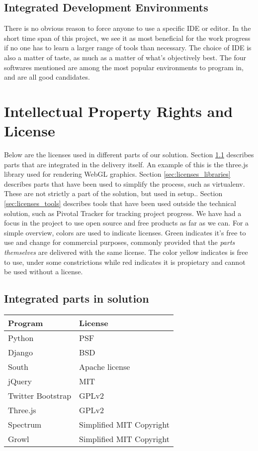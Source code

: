 \documentclass{report}
\begin{document}
\subsection{Integrated Development Environments}
There is no obvious reason to force anyone to use a specific IDE or editor. In the short time span of this project, we see it as most beneficial for the work progress if no one has to learn a larger range of tools than necessary. The choice of IDE is also a matter of taste, as much as a matter of what’s objectively best. The four softwares mentioned are among the most popular environments to program in, and are all good candidates.

\newpage
\section{Intellectual Property Rights and License}
Below are the licenses used in different parts of our solution. Section \ref{sec:licenses_integrated} describes parts that are integrated in the delivery itself. An example of this is the three.js library used for rendering WebGL graphics. Section \ref{sec:licenses_libraries} describes parts that have been used to simplify the process, such as virtualenv. These are not strictly a part of the solution, but used in setup.. Section \ref{sec:licenses_tools} describes tools that have been used outside the technical solution, such as Pivotal Tracker for tracking project progress. We have had a focus in the project to use open source and free products as far as we can. For a simple overview, colors are used to indicate licenses. Green indicates it's free to use and change for commercial purposes, commonly provided that the \emph{parts themselves} are delivered with the same license. The color yellow indicates is free to use, under some constrictions while red indicates it is propietary and cannot be used without a license.
\subsection{Integrated parts in solution} \label{sec:licenses_integrated}
\begin{tabular}{|l|l|}  \hline
\textbf{Program} & \textbf{License} \\ \hline
Python &\cellcolor{green!25} PSF\cite{license_python} \\ \hline
Django &\cellcolor{green!25} BSD\cite{license_django} \\ \hline
South &\cellcolor{green!25} Apache license\cite{license_south} \\ \hline
jQuery &\cellcolor{green!25} MIT\cite{license_jquery} \\ \hline
Twitter Bootstrap &\cellcolor{green!25} GPLv2\cite{license_bootstrap} \\ \hline
Three.js & \cellcolor{green!25}GPLv2\cite{license_three} \\ \hline
Spectrum & \cellcolor{green!25}Simplified MIT Copyright\cite{license_spectrum} \\ \hline
Growl &\cellcolor{green!25} Simplified MIT Copyright\cite{license_growl} \\ \hline
\end{tabular}
\end{document}
